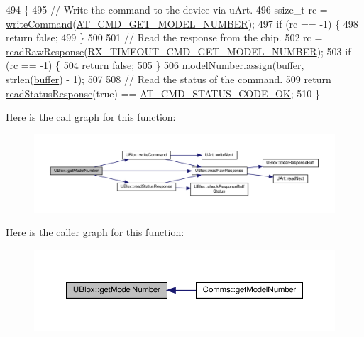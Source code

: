 \begin{DoxyCode}
494 \{
495     \textcolor{comment}{// Write the command to the device via uArt.}
496     ssize\_t rc = \hyperlink{class_u_blox_af604d1897a66192bf1c2a11997f2634d}{writeCommand}(\hyperlink{_u_blox_8cpp_ae8be964d0669627bf8fbd79040031222}{AT\_CMD\_GET\_MODEL\_NUMBER});
497     \textcolor{keywordflow}{if} (rc == -1) \{
498         \textcolor{keywordflow}{return} \textcolor{keyword}{false};
499     \}
500 
501     \textcolor{comment}{// Read the response from the chip.}
502     rc = \hyperlink{class_u_blox_ab4a7ab4b8922d91e23f273ae160c1bed}{readRawResponse}(\hyperlink{_u_blox_8cpp_a29c79801808a2dc36f093e853326396a}{RX\_TIMEOUT\_CMD\_GET\_MODEL\_NUMBER});
503     \textcolor{keywordflow}{if} (rc == -1) \{
504         \textcolor{keywordflow}{return} \textcolor{keyword}{false};
505     \}
506     modelNumber.assign(\hyperlink{class_u_blox_a6ca4b90f3dc4e856181dce1ebda6f82c}{buffer}, strlen(\hyperlink{class_u_blox_a6ca4b90f3dc4e856181dce1ebda6f82c}{buffer}) - 1);
507 
508     \textcolor{comment}{// Read the status of the command.}
509     \textcolor{keywordflow}{return} \hyperlink{class_u_blox_a4eaca5b1b1c4b5b6f6164b220dd43e0b}{readStatusResponse}(\textcolor{keyword}{true}) == \hyperlink{_u_blox_8cpp_a6ebc1682eb6b9964fccb4a61688ff307}{AT\_CMD\_STATUS\_CODE\_OK};
510 \}
\end{DoxyCode}
Here is the call graph for this function\+:\nopagebreak
\begin{figure}[H]
\begin{center}
\leavevmode
\includegraphics[width=350pt]{da/df6/class_u_blox_ab9b9a03e10360c931686c1fe04af078d_cgraph}
\end{center}
\end{figure}
Here is the caller graph for this function\+:\nopagebreak
\begin{figure}[H]
\begin{center}
\leavevmode
\includegraphics[width=350pt]{da/df6/class_u_blox_ab9b9a03e10360c931686c1fe04af078d_icgraph}
\end{center}
\end{figure}
\mbox{\label{class_u_blox_aee30d82dcf52335d19f77e766db78ab4}} 
